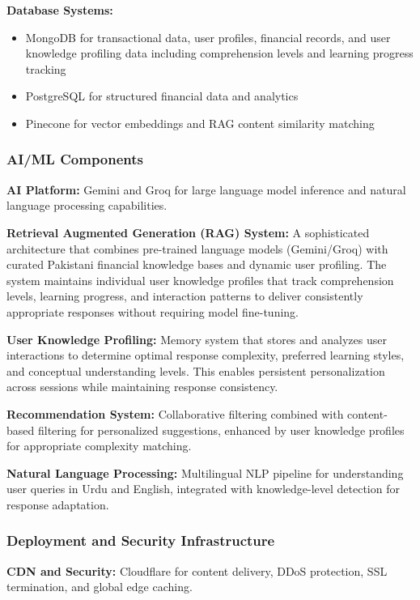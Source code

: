 \documentclass[12pt]{article}
\begin{document}
\textbf{Database Systems:}
\begin{itemize}
    \item MongoDB for transactional data, user profiles, financial records, and user knowledge profiling data including comprehension levels and learning progress tracking
    \item PostgreSQL for structured financial data and analytics
    \item Pinecone for vector embeddings and RAG content similarity matching
\end{itemize}

\subsubsection{AI/ML Components}
\textbf{AI Platform:} Gemini and Groq for large language model inference and natural language processing capabilities.

\textbf{Retrieval Augmented Generation (RAG) System:} A sophisticated architecture that combines pre-trained language models (Gemini/Groq) with curated Pakistani financial knowledge bases and dynamic user profiling. The system maintains individual user knowledge profiles that track comprehension levels, learning progress, and interaction patterns to deliver consistently appropriate responses without requiring model fine-tuning.

\textbf{User Knowledge Profiling:} Memory system that stores and analyzes user interactions to determine optimal response complexity, preferred learning styles, and conceptual understanding levels. This enables persistent personalization across sessions while maintaining response consistency.

\textbf{Recommendation System:} Collaborative filtering combined with content-based filtering for personalized suggestions, enhanced by user knowledge profiles for appropriate complexity matching.

\textbf{Natural Language Processing:} Multilingual NLP pipeline for understanding user queries in Urdu and English, integrated with knowledge-level detection for response adaptation.

\subsubsection{Deployment and Security Infrastructure}
\textbf{CDN and Security:} Cloudflare for content delivery, DDoS protection, SSL termination, and global edge caching.
\end{document}
